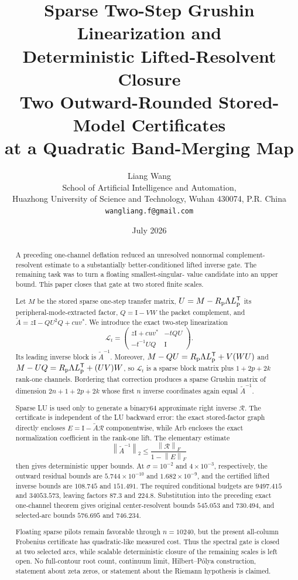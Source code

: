 \documentclass[11pt]{article}
\title{\textbf{Sparse Two-Step Grushin Linearization and\\
Deterministic Lifted-Resolvent Closure}\\[0.35em]
\large Two Outward-Rounded Stored-Model Certificates\\
at a Quadratic Band-Merging Map}
\author{Liang Wang\\
\small School of Artificial Intelligence and Automation,\\[-0.2em]
\small Huazhong University of Science and Technology, Wuhan 430074, P.R. China\\
\small \texttt{wangliang.f@gmail.com}}
\date{July 2026}
\theoremstyle{definition}
\theoremstyle{remark}
\newcommand{\Id}{\mathrm I}
\newcommand{\norm}[1]{\left\lVert#1\right\rVert}
\begin{document}
\maketitle

\begin{abstract}
A preceding one-channel deflation reduced an unresolved nonnormal
complement-resolvent estimate to a substantially better-conditioned lifted
inverse gate.  The remaining task was to turn a floating smallest-singular-
value candidate into an upper bound.  This paper closes that gate at two
stored finite scales.

Let $M$ be the stored sparse one-step transfer matrix,
$U=M-R_{\rm p}\Lambda L_{\rm p}^{\mathsf T}$ its peripheral-mode-extracted
factor, $Q=\Id-VW$ the packet complement, and
$\widetilde A=z\Id-QU^2Q+cuv^*$.  We introduce the exact two-step
linearization
\[
 \mathcal L_t=
 \begin{pmatrix}
  z\Id+cuv^* & -tQU\\
  -t^{-1}UQ & \Id
 \end{pmatrix}.
\]
Its leading inverse block is $\widetilde A^{-1}$.  Moreover,
$M-QU=R_{\rm p}\Lambda L_{\rm p}^{\mathsf T}+V(WU)$ and
$M-UQ=R_{\rm p}\Lambda L_{\rm p}^{\mathsf T}+(UV)W$, so
$\mathcal L_t$ is a sparse block matrix plus $1+2p+2k$ rank-one channels.
Bordering that correction produces a sparse Grushin matrix of dimension
$2n+1+2p+2k$ whose first $n$ inverse coordinates again equal
$\widetilde A^{-1}$.

Sparse LU is used only to generate a binary64 approximate right inverse
$\mathcal R$.  The certificate is independent of the LU backward error:
the exact stored-factor graph directly encloses
$E=\Id-\widetilde A\mathcal R$ componentwise, while Arb encloses the exact
normalization coefficient in the rank-one lift.  The elementary estimate
\[
 \norm{\widetilde A^{-1}}_2
 \leq \frac{\norm{\mathcal R}_F}{1-\norm{E}_F}
\]
then gives deterministic upper bounds.  At $\sigma=10^{-2}$ and
$4\times10^{-3}$, respectively, the outward residual bounds are
$5.744\times10^{-10}$ and $1.682\times10^{-9}$, and the certified lifted
inverse bounds are $108.745$ and $151.491$.  The required conditional budgets
are $9497.415$ and $34053.573$, leaving factors $87.3$ and $224.8$.
Substitution into the preceding exact one-channel theorem gives original
center-resolvent bounds $545.053$ and $730.494$, and selected-arc bounds
$576.695$ and $746.234$.

Floating sparse pilots remain favorable through $n=10240$, but the present
all-column Frobenius certificate has quadratic-like measured cost.  Thus the
spectral gate is closed at two selected arcs, while scalable deterministic
closure of the remaining scales is left open.  No full-contour root count,
continuum limit, Hilbert--P\'olya construction, statement about zeta zeros,
or statement about the Riemann hypothesis is claimed.
\end{abstract}
\end{document}
